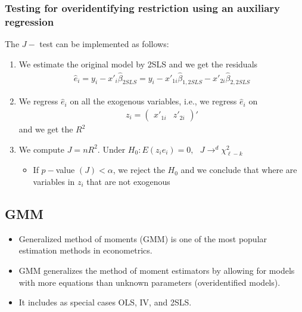 \documentclass[a4paper,twoside,11pt]{article}
\begin{document}
\subsubsection{Testing for overidentifying restriction using an auxiliary regression}
The $J-$ test can be implemented as follows:
\begin{enumerate}
    \item We estimate the original model by 2SLS and we get the residuals
\begin{equation*}
\begin{aligned}
\hat{e}_i = y_i - x'_i \hat{\beta}_{2SLS} = y_i - x'_{1i} \hat{\beta}_{1,2SLS} - x'_{2i} \hat{\beta}_{2,2SLS} 
\end{aligned} 
\end{equation*}
    \item We regress $\hat{e}_i$ on all the exogenous variables, i.e., we regress $\hat{e}_i $ on 
\begin{equation*}
\begin{aligned}
z_i = \begin{pmatrix}
x'_{1i} & z'_{2i}
\end{pmatrix}'
\end{aligned} 
\end{equation*}
and we get the $R^2$
    \item We compute $J=nR^2$. Under $H_0 : E(z_i e_i)=0, \ \ \ J \rightarrow^d \chi^2_{\ell -k}$
    \begin{itemize}
        \item If $p-$value $(J)<\alpha$, we reject the $H_0$ and we conclude that where are variables in $z_i$ that are not exogenous
    \end{itemize}
\end{enumerate}
\subsection{GMM}
\begin{itemize}
    \item  Generalized method of moments (GMM) is one of the most popular estimation methods in econometrics.
    \item GMM generalizes the method of moment estimators by allowing for models with more equations than unknown parameters (overidentified models).
    \item It includes as special cases OLS, IV, and 2SLS.
\end{itemize}
\end{document}
